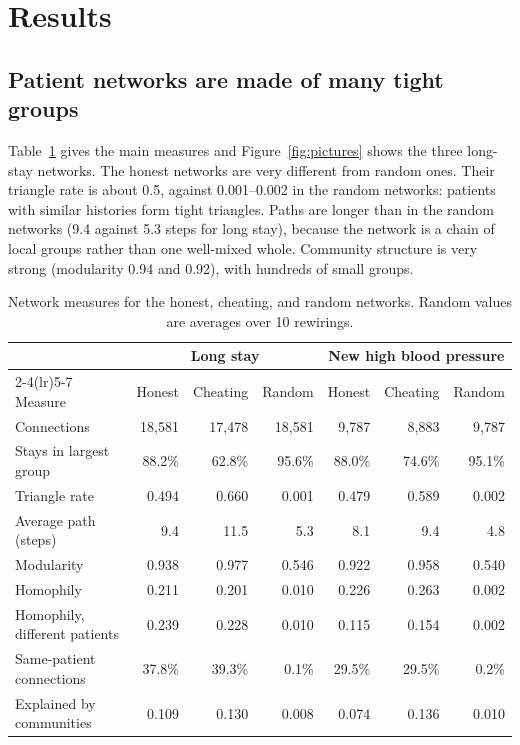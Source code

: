 \section{Results}
\label{sec:results}

\subsection{Patient networks are made of many tight groups}

Table~\ref{tab:networks} gives the main measures and Figure~\ref{fig:pictures} shows the three long-stay networks. The honest networks are very different from random ones. Their triangle rate is about 0.5, against 0.001--0.002 in the random networks: patients with similar histories form tight triangles. Paths are longer than in the random networks (9.4 against 5.3 steps for long stay), because the network is a chain of local groups rather than one well-mixed whole. Community structure is very strong (modularity 0.94 and 0.92), with hundreds of small groups.

\begin{table}[!t]
\centering
\caption{Network measures for the honest, cheating, and random networks. Random values are averages over 10 rewirings.}
\label{tab:networks}
\small
\begin{tabular}{lrrrrrr}
\toprule
 & \multicolumn{3}{c}{Long stay} & \multicolumn{3}{c}{New high blood pressure} \\
\cmidrule(lr){2-4}\cmidrule(lr){5-7}
Measure & Honest & Cheating & Random & Honest & Cheating & Random \\
\midrule
Connections                 & 18,581 & 17,478 & 18,581 & 9,787 & 8,883 & 9,787 \\
Stays in largest group      & 88.2\% & 62.8\% & 95.6\% & 88.0\% & 74.6\% & 95.1\% \\
Triangle rate               & 0.494 & 0.660 & 0.001 & 0.479 & 0.589 & 0.002 \\
Average path (steps)        & 9.4 & 11.5 & 5.3 & 8.1 & 9.4 & 4.8 \\
Modularity                  & 0.938 & 0.977 & 0.546 & 0.922 & 0.958 & 0.540 \\
Homophily                   & 0.211 & 0.201 & 0.010 & 0.226 & 0.263 & 0.002 \\
Homophily, different patients & 0.239 & 0.228 & 0.010 & 0.115 & 0.154 & 0.002 \\
Same-patient connections    & 37.8\% & 39.3\% & 0.1\% & 29.5\% & 29.5\% & 0.2\% \\
Explained by communities    & 0.109 & 0.130 & 0.008 & 0.074 & 0.136 & 0.010 \\
\bottomrule
\end{tabular}
\end{table}

